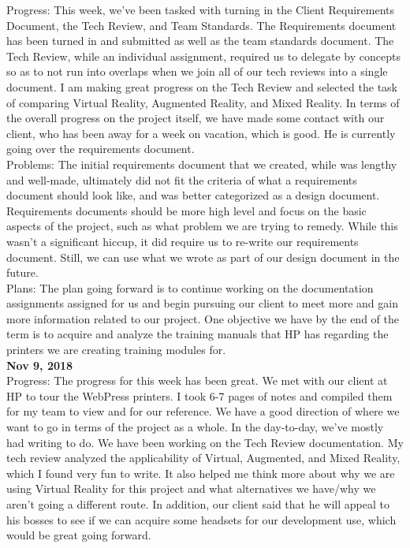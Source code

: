 Progress: 	
This week, we've been tasked with turning in the Client Requirements Document, the Tech Review, and Team Standards. The Requirements document has been turned in and submitted as well as the team standards document. The Tech Review, while an individual assignment, required us to delegate by concepts so as to not run into overlaps when we join all of our tech reviews into a single document. I am making great progress on the Tech Review and selected the task of comparing Virtual Reality, Augmented Reality, and Mixed Reality. In terms of the overall progress on the project itself, we have made some contact with our client, who has been away for a week on vacation, which is good. He is currently going over the requirements document.\\

Problems: 	The initial requirements document that we created, while was lengthy and well-made, ultimately did not fit the criteria of what a requirements document should look like, and was better categorized as a design document. Requirements documents should be more high level and focus on the basic aspects of the project, such as what problem we are trying to remedy. While this wasn't a significant hiccup, it did require us to re-write our requirements document. Still, we can use what we wrote as part of our design document in the future.\\
Plans: 	The plan going forward is to continue working on the documentation assignments assigned for us and begin pursuing our client to meet more and gain more information related to our project. One objective we have by the end of the term is to acquire and analyze the training manuals that HP has regarding the printers we are creating training modules for.\\
\textbf{Nov 9, 2018}\\
Progress: 	The progress for this week has been great. We met with our client at HP to tour the WebPress printers. I took 6-7 pages of notes and compiled them for my team to view and for our reference. We have a good direction of where we want to go in terms of the project as a whole. In the day-to-day, we've mostly had writing to do. We have been working on the Tech Review documentation. My tech review analyzed the applicability of Virtual, Augmented, and Mixed Reality, which I found very fun to write. It also helped me think more about why we are using Virtual Reality for this project and what alternatives we have/why we aren't going a different route. In addition, our client said that he will appeal to his bosses to see if we can acquire some headsets for our development use, which would be great going forward. \\
